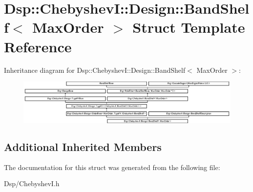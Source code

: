 \hypertarget{structDsp_1_1ChebyshevI_1_1Design_1_1BandShelf}{\section{Dsp\-:\-:Chebyshev\-I\-:\-:Design\-:\-:Band\-Shelf$<$ Max\-Order $>$ Struct Template Reference}
\label{structDsp_1_1ChebyshevI_1_1Design_1_1BandShelf}
}
Inheritance diagram for Dsp\-:\-:Chebyshev\-I\-:\-:Design\-:\-:Band\-Shelf$<$ Max\-Order $>$\-:\begin{figure}[H]
\begin{center}
\leavevmode
\includegraphics[height=2.244489cm]{structDsp_1_1ChebyshevI_1_1Design_1_1BandShelf}
\end{center}
\end{figure}
\subsection*{Additional Inherited Members}


The documentation for this struct was generated from the following file\-:\begin{DoxyCompactItemize}
\item 
Dsp/Chebyshev\-I.\-h\end{DoxyCompactItemize}
